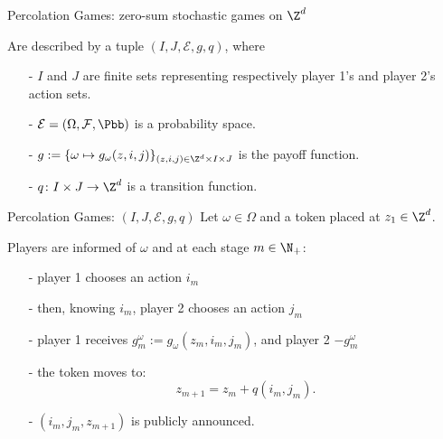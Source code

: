 \begin{frame}{Percolation Games: zero-sum stochastic games on $\Z^d$}
  

  \pause 
  Are described by a tuple $(I, J, \mathcal{E}, g, q)$, where
  \vspace{0.5cm}

  \begin{itemize}
    \item[-] $I$ and $J$ are finite sets representing respectively player 1’s and player 2’s action sets.
    \item[-] $\mathcal{E} = (\Omega, \mathcal{F}, \Pbb)$ is a probability space. 
    \item[-] $g := \{\omega \mapsto g_{\omega}(z,i,j)\}_{(z,i,j) \in \Z^d \times I \times J}$ is the payoff function.
    \item[-] $q \colon I \times J \to \Z^d$ is a transition function. 
  \end{itemize}
\end{frame}

\begin{frame}{Percolation Games: $(I, J, \mathcal{E}, g, q)$}
  Let $\omega \in \Omega$ and a token placed at $z_1 \in \Z^d$.
  \vspace{0.2cm}
  \pause

  Players are informed of $\omega$ and at each stage $m \in \N_+$:
  \begin{itemize}
    \item[-] player 1 chooses an action $i_m$ 
    \item[-] then, knowing $i_m$, player 2 chooses an action $j_m$
    \item[-] player 1 receives $g_m^{\omega} := g_{\omega}(z_{m}, i_m, j_m)$, and player 2 $-g_m^{\omega}$
    \item[-] the token moves to:  
      \[
        z_{m+1} = z_m + q(i_m, j_m).
      \]
    \item[-] $(i_m, j_m, z_{m+1})$ is publicly announced.
  \end{itemize}
\end{frame}	 

